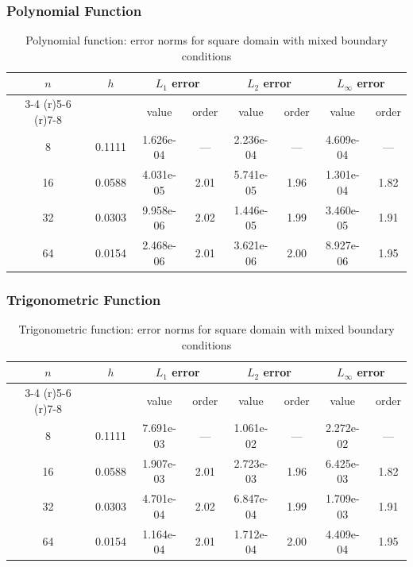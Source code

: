 \documentclass[12pt,a4paper]{article}
\begin{document}
\subsubsection{Polynomial Function}
\begin{table}[H]
\centering
\caption{Polynomial function: error norms for square domain with mixed boundary conditions}
\begin{tabular}{cccccccc}
\toprule
$n$ & $h$ & \multicolumn{2}{c}{$L_1$ error} & \multicolumn{2}{c}{$L_2$ error} & \multicolumn{2}{c}{$L_\infty$ error} \\
\cmidrule(r){3-4} \cmidrule(r){5-6} \cmidrule(r){7-8}
& & value & order & value & order & value & order \\
\midrule
8  & 0.1111 & 1.626e-04 & --- & 2.236e-04 & --- & 4.609e-04 & --- \\
16 & 0.0588 & 4.031e-05 & 2.01 & 5.741e-05 & 1.96 & 1.301e-04 & 1.82 \\
32 & 0.0303 & 9.958e-06 & 2.02 & 1.446e-05 & 1.99 & 3.460e-05 & 1.91 \\
64 & 0.0154 & 2.468e-06 & 2.01 & 3.621e-06 & 2.00 & 8.927e-06 & 1.95 \\
\bottomrule
\end{tabular}
\end{table}

\subsubsection{Trigonometric Function}
\begin{table}[H]
\centering
\caption{Trigonometric function: error norms for square domain with mixed boundary conditions}
\begin{tabular}{cccccccc}
\toprule
$n$ & $h$ & \multicolumn{2}{c}{$L_1$ error} & \multicolumn{2}{c}{$L_2$ error} & \multicolumn{2}{c}{$L_\infty$ error} \\
\cmidrule(r){3-4} \cmidrule(r){5-6} \cmidrule(r){7-8}
& & value & order & value & order & value & order \\
\midrule
8  & 0.1111 & 7.691e-03 & --- & 1.061e-02 & --- & 2.272e-02 & --- \\
16 & 0.0588 & 1.907e-03 & 2.01 & 2.723e-03 & 1.96 & 6.425e-03 & 1.82 \\
32 & 0.0303 & 4.701e-04 & 2.02 & 6.847e-04 & 1.99 & 1.709e-03 & 1.91 \\
64 & 0.0154 & 1.164e-04 & 2.01 & 1.712e-04 & 2.00 & 4.409e-04 & 1.95 \\
\bottomrule
\end{tabular}
\end{table}
\end{document}
